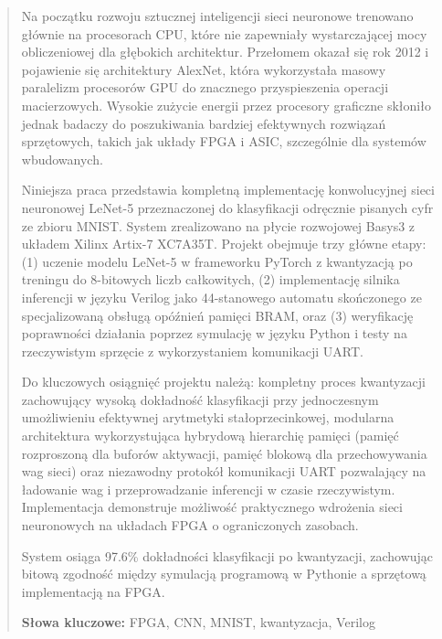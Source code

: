 \documentclass[12pt,a4paper]{report}
\begin{document}
\thispagestyle{empty}
\begin{otherlanguage}{polish}
\begin{abstract}
Na początku rozwoju sztucznej inteligencji sieci neuronowe trenowano głównie na procesorach CPU, które nie zapewniały wystarczającej mocy obliczeniowej dla głębokich architektur. Przełomem okazał się rok 2012 i pojawienie się architektury AlexNet, która wykorzystała masowy paralelizm procesorów GPU do znacznego przyspieszenia operacji macierzowych. Wysokie zużycie energii przez procesory graficzne skłoniło jednak badaczy do poszukiwania bardziej efektywnych rozwiązań sprzętowych, takich jak układy FPGA i ASIC, szczególnie dla systemów wbudowanych.

Niniejsza praca przedstawia kompletną implementację konwolucyjnej sieci neuronowej LeNet-5 przeznaczonej do klasyfikacji odręcznie pisanych cyfr ze zbioru MNIST. System zrealizowano na płycie rozwojowej Basys3 z układem Xilinx Artix-7 XC7A35T. Projekt obejmuje trzy główne etapy: (1) uczenie modelu LeNet-5 w frameworku PyTorch z kwantyzacją po treningu do 8-bitowych liczb całkowitych, (2) implementację silnika inferencji w języku Verilog jako 44-stanowego automatu skończonego ze specjalizowaną obsługą opóźnień pamięci BRAM, oraz (3) weryfikację poprawności działania poprzez symulację w języku Python i testy na rzeczywistym sprzęcie z wykorzystaniem komunikacji UART.

Do kluczowych osiągnięć projektu należą: kompletny proces kwantyzacji zachowujący wysoką dokładność klasyfikacji przy jednoczesnym umożliwieniu efektywnej arytmetyki stałoprzecinkowej, modularna architektura wykorzystująca hybrydową hierarchię pamięci (pamięć rozproszoną dla buforów aktywacji, pamięć blokową dla przechowywania wag sieci) oraz niezawodny protokół komunikacji UART pozwalający na ładowanie wag i przeprowadzanie inferencji w czasie rzeczywistym. Implementacja demonstruje możliwość praktycznego wdrożenia sieci neuronowych na układach FPGA o ograniczonych zasobach.

System osiąga 97.6\% dokładności klasyfikacji po kwantyzacji, zachowując bitową zgodność między symulacją programową w Pythonie a sprzętową implementacją na FPGA.

\textbf{Słowa kluczowe:} FPGA, CNN, MNIST, kwantyzacja, Verilog
\end{abstract}
\end{otherlanguage}
\end{document}
